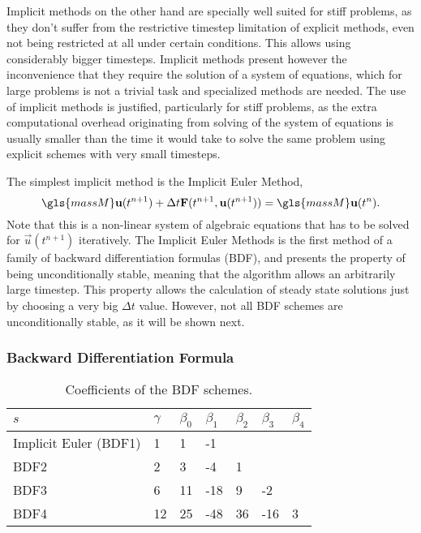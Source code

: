 Implicit methods  on the other hand are specially well suited for stiff problems, as they don't suffer from the restrictive timestep limitation of explicit methods, even not being restricted at all under certain conditions. This allows using considerably bigger timesteps. Implicit methods present however the inconvenience that they require the solution of a system of equations, which for large problems is not a trivial task and specialized methods are needed. The use of implicit methods is justified, particularly for stiff problems, as the extra computational overhead originating from solving of the system of equations is usually smaller than the time it would take to solve the same problem using explicit schemes with very small timesteps.

The simplest implicit method is the Implicit Euler Method,
\begin{equation}
\gls{massM}\vec{u}(t^{n+1}) + \Delta t\vec{F}(t^{n+1},\vec{u}(t^{n+1}))= \gls{massM}\vec{u}(t^{n}).
\end{equation}
Note that this is a non-linear system of algebraic equations that has to be solved for $\vec{u}(t^{n+1})$ iteratively. The Implicit Euler Methods is the first method of a family of backward differentiation formulas (BDF), and presents the property of being unconditionally stable, meaning that the algorithm allows an arbitrarily large timestep. This property allows the calculation of steady state solutions just by choosing a very big $\Delta t$ value. However, not all BDF schemes are unconditionally stable, as it will be shown next.
\subsubsection{Backward Differentiation Formula}
\begin{table}[h]
	\centering
	\begin{tabular}{lllllll}
		\hline
		$s$                   & $\gamma$ & $\beta_0$ & $\beta_1$ & $\beta_2$ & $\beta_3$ & $\beta_4$ \\ \hline
		Implicit Euler (BDF1) & 1        & 1         & -1        &           &           &           \\
		BDF2                  & 2        & 3         & -4        & 1         &           &           \\
		BDF3                  & 6        & 11        & -18       & 9         & -2        &           \\
		BDF4                  & 12       & 25        & -48       & 36        & -16       & 3         \\ \hline
	\end{tabular}
	\caption{Coefficients of the BDF schemes.}
	\label{tab:BDFCoeff}
\end{table}

